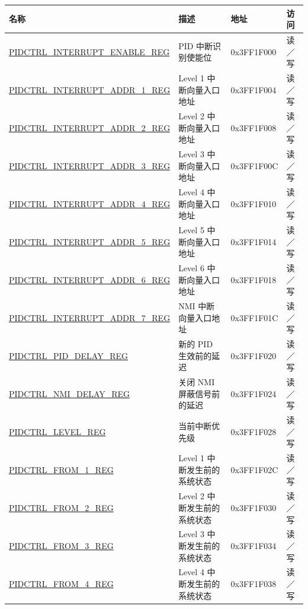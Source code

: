 \begin{longtable}{ | p{5.8cm} | p{5.5cm} | p{2.2cm} | p{1.5cm} | }
\hline\rowcolor{lightgray}
名称 & 描述 &  地址 & 访问  \\ \hline
\hyperref[regdesc:PIDCTRLINTERRUPTENABLEREG]{PIDCTRL\_INTERRUPT\_ENABLE\_REG} & PID 中断识别使能位 & 0x3FF1F000 & 读／写 \\ \hline
\hyperref[regdesc:PIDCTRLINTERRUPTADDR1REG]{PIDCTRL\_INTERRUPT\_ADDR\_1\_REG} & Level 1 中断向量入口地址 & 0x3FF1F004 & 读／写 \\ \hline
\hyperref[regdesc:PIDCTRLINTERRUPTADDR2REG]{PIDCTRL\_INTERRUPT\_ADDR\_2\_REG} & Level 2 中断向量入口地址 & 0x3FF1F008 & 读／写 \\ \hline
\hyperref[regdesc:PIDCTRLINTERRUPTADDR3REG]{PIDCTRL\_INTERRUPT\_ADDR\_3\_REG} & Level 3 中断向量入口地址 & 0x3FF1F00C & 读／写 \\ \hline
\hyperref[regdesc:PIDCTRLINTERRUPTADDR4REG]{PIDCTRL\_INTERRUPT\_ADDR\_4\_REG} & Level 4 中断向量入口地址 & 0x3FF1F010 & 读／写 \\ \hline
\hyperref[regdesc:PIDCTRLINTERRUPTADDR5REG]{PIDCTRL\_INTERRUPT\_ADDR\_5\_REG} & Level 5 中断向量入口地址 & 0x3FF1F014 & 读／写 \\ \hline
\hyperref[regdesc:PIDCTRLINTERRUPTADDR6REG]{PIDCTRL\_INTERRUPT\_ADDR\_6\_REG} & Level 6 中断向量入口地址 & 0x3FF1F018 & 读／写 \\ \hline
\hyperref[regdesc:PIDCTRLINTERRUPTADDR7REG]{PIDCTRL\_INTERRUPT\_ADDR\_7\_REG} & NMI 中断向量入口地址 & 0x3FF1F01C & 读／写 \\ \hline
\hyperref[regdesc:PIDCTRLPIDDELAYREG]{PIDCTRL\_PID\_DELAY\_REG} & 新的 PID 生效前的延迟 & 0x3FF1F020 & 读／写 \\ \hline
\hyperref[regdesc:PIDCTRLNMIDELAYREG]{PIDCTRL\_NMI\_DELAY\_REG} & 关闭 NMI 屏蔽信号前的延迟 & 0x3FF1F024 & 读／写 \\ \hline
\hyperref[regdesc:PIDCTRLLEVELREG]{PIDCTRL\_LEVEL\_REG} & 当前中断优先级 & 0x3FF1F028 & 读／写 \\ \hline
\hyperref[regdesc:PIDCTRLFROMnREG]{PIDCTRL\_FROM\_1\_REG} & Level 1 中断发生前的系统状态 & 0x3FF1F02C & 读／写 \\ \hline
\hyperref[regdesc:PIDCTRLFROMnREG]{PIDCTRL\_FROM\_2\_REG} & Level 2 中断发生前的系统状态 & 0x3FF1F030 & 读／写 \\ \hline
\hyperref[regdesc:PIDCTRLFROMnREG]{PIDCTRL\_FROM\_3\_REG} & Level 3 中断发生前的系统状态 & 0x3FF1F034 & 读／写 \\ \hline
\hyperref[regdesc:PIDCTRLFROMnREG]{PIDCTRL\_FROM\_4\_REG} & Level 4 中断发生前的系统状态 & 0x3FF1F038 & 读／写 \\ \hline

\end{longtable}
